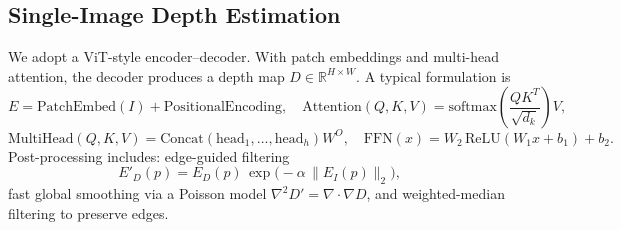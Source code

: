 \documentclass[12pt]{article}
\begin{document}
\subsection{Single-Image Depth Estimation}
We adopt a ViT-style encoder–decoder. With patch embeddings and multi-head attention, the decoder produces a depth map $D\in\mathbb{R}^{H\times W}$. A typical formulation is
\[ E = \mathrm{PatchEmbed}(I) + \mathrm{PositionalEncoding}, \quad \mathrm{Attention}(Q,K,V)=\mathrm{softmax}\!\left(\frac{QK^T}{\sqrt{d_k}}\right) V, \]
\[ \mathrm{MultiHead}(Q,K,V)=\mathrm{Concat}(\mathrm{head}_1,\ldots,\mathrm{head}_h)W^O, \quad \mathrm{FFN}(x)=W_2\,\mathrm{ReLU}(W_1x+b_1)+b_2. \]
Post-processing includes: edge-guided filtering
\[ E'_D(p) = E_D(p)\, \exp\big(-\alpha\, \lVert E_I(p)\rVert_2\big), \]
fast global smoothing via a Poisson model $\nabla^2 D' = \nabla\cdot\nabla D$, and weighted-median filtering to preserve edges.
\end{document}
